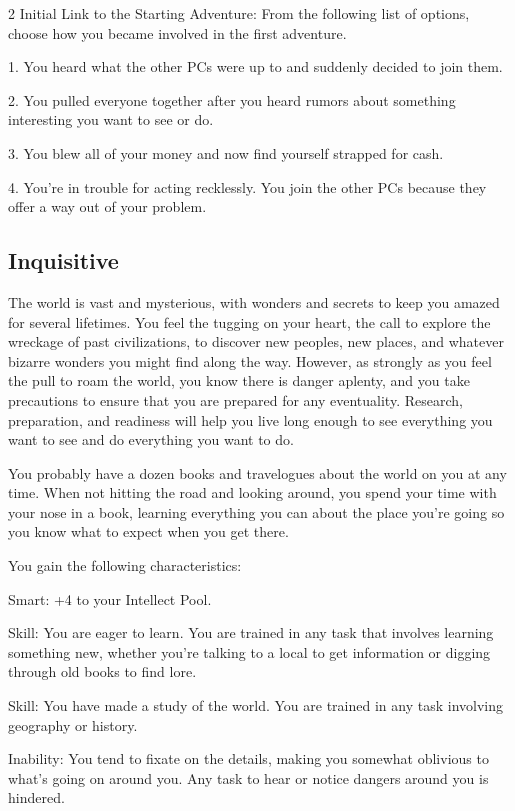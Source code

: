 \begin{multicols}{2}
Initial Link to the Starting Adventure: From the following list of options, choose how you became involved in the first adventure.

1. You heard what the other PCs were up to and suddenly decided to join them. 

2. You pulled everyone together after you heard rumors about something interesting you want to see or do.

3. You blew all of your money and now find yourself strapped for cash.

4. You’re in trouble for acting recklessly. You join the other PCs because they offer a way out of your problem.

\subsection{Inquisitive}

The world is vast and mysterious, with wonders and secrets to keep you amazed for several lifetimes. You feel the tugging on your heart, the call to explore the wreckage of past civilizations, to discover new peoples, new places, and whatever bizarre wonders you might find along the way. However, as strongly as you feel the pull to roam the world, you know there is danger aplenty, and you take precautions to ensure that you are prepared for any eventuality. Research, preparation, and readiness will help you live long enough to see everything you want to see and do everything you want to do.

You probably have a dozen books and travelogues about the world on you at any time. When not hitting the road and looking around, you spend your time with your nose in a book, learning everything you can about the place you’re going so you know what to expect when you get there.

You gain the following characteristics:

Smart: +4 to your Intellect Pool.

Skill: You are eager to learn. You are trained in any task that involves learning something new, whether you’re talking to a local to get information or digging through old books to find lore.

Skill: You have made a study of the world. You are trained in any task involving geography or history.

Inability: You tend to fixate on the details, making you somewhat oblivious to what’s going on around you. Any task to hear or notice dangers around you is hindered.


\end{multicols}
